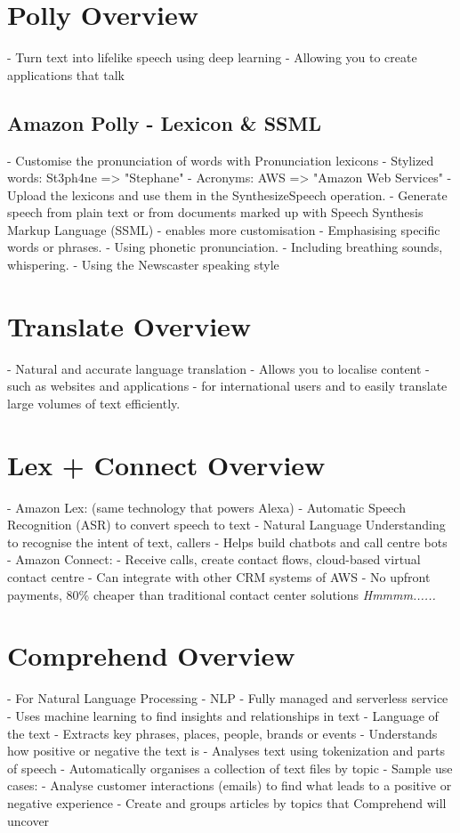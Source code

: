 \documentclass[11pt]{book}
\begin{document}
    \section{Polly Overview}
    - Turn text into lifelike speech using deep learning
    - Allowing you to create applications that talk

    \subsection{Amazon Polly - Lexicon \& SSML}
    - Customise the pronunciation of words with Pronunciation lexicons
    - Stylized words: St3ph4ne => "Stephane"
    - Acronyms: AWS => "Amazon Web Services"
    - Upload the lexicons and use them in the SynthesizeSpeech operation.
    - Generate speech from plain text or from documents marked up with Speech Synthesis Markup Language (SSML) - enables more customisation
    - Emphasising specific words or phrases.
    - Using phonetic pronunciation.
    - Including breathing sounds, whispering.
    - Using the Newscaster speaking style


    \section{Translate Overview}
    - Natural and accurate language translation
    - Allows you to localise content - such as websites and applications - for international users and to easily translate large volumes of text efficiently.


    \section{Lex + Connect Overview}
    - Amazon Lex: (same technology that powers Alexa)
    - Automatic Speech Recognition (ASR) to convert speech to text
    - Natural Language Understanding to recognise the intent of text, callers
    - Helps build chatbots and call centre bots
    - Amazon Connect:
    - Receive calls, create contact flows, cloud-based virtual contact centre
    - Can integrate with other CRM systems of AWS
    - No upfront payments, 80\% cheaper than traditional contact center solutions \textit{Hmmmm......}


    \section{Comprehend Overview}
    - For Natural Language Processing - NLP
    - Fully managed and serverless service
    - Uses machine learning to find insights and relationships in text
    - Language of the text
    - Extracts key phrases, places, people, brands or events
    - Understands how positive or negative the text is
    - Analyses text using tokenization and parts of speech
    - Automatically organises a collection of text files by topic
    - Sample use cases:
    - Analyse customer interactions (emails) to find what leads to a positive or negative experience
    - Create and groups articles by topics that Comprehend will uncover
\end{document}
